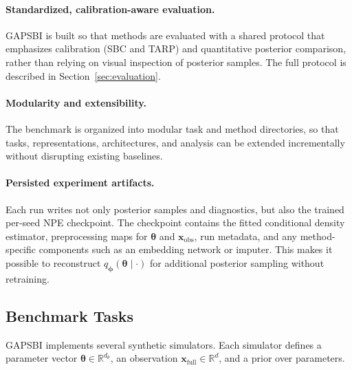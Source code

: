 \documentclass{article} %
\providecommand{\xfull}{\mathbf{x}_{\mathrm{full}}}
\providecommand{\xobs}{\mathbf{x}_{\mathrm{obs}}}
\providecommand{\thetab}{\boldsymbol{\theta}}
\providecommand{\phib}{\boldsymbol{\phi}}
\begin{document}
\paragraph{Standardized, calibration-aware evaluation.} GAPSBI is built so that
methods are evaluated with a shared protocol that emphasizes calibration (SBC and
TARP) and quantitative posterior comparison, rather than relying on visual
inspection of posterior samples. The full protocol is described in
Section~\ref{sec:evaluation}.

\paragraph{Modularity and extensibility.} The benchmark is organized into
modular task and method directories, so that tasks, representations,
architectures, and analysis can be extended incrementally without disrupting
existing baselines.

\paragraph{Persisted experiment artifacts.} Each run writes not only posterior
samples and diagnostics, but also the trained per-seed NPE checkpoint. The
checkpoint contains the fitted conditional density estimator, preprocessing maps
for $\thetab$ and $\xobs$, run metadata, and any method-specific components such
as an embedding network or imputer. This makes it possible to reconstruct
$q_{\phib}(\thetab \mid \cdot)$ for additional posterior sampling without
retraining.

\subsection{Benchmark Tasks}
\label{sec:tasks}

GAPSBI implements several synthetic simulators. Each simulator defines a parameter
vector $\thetab \in \mathbb{R}^{d_\theta}$, an observation
$\xfull \in \mathbb{R}^{d}$, and a prior over parameters.
\end{document}
